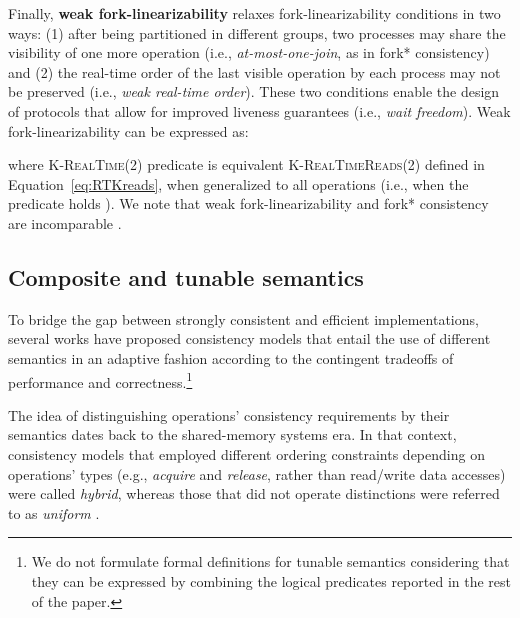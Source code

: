 \documentclass[letter, 11pt]{article}
\renewcommand{\cite}{\citep}
\begin{document}
Finally, \textbf{weak fork-linearizability} \cite{Cachin.Keidar.ea:11} relaxes fork-linearizability conditions
in two ways: (1) after being partitioned in different groups, two processes may 
share the visibility of one more operation
(i.e., \emph{at-most-one-join}, as in fork* consistency) 
and (2) the real-time order of the last visible operation by each process may not be preserved (i.e., \emph{weak real-time order}).
These two conditions enable the design of protocols that allow for improved liveness guarantees (i.e., \emph{wait freedom}).
Weak fork-linearizability can be expressed as:

where \textsc{K-RealTime}(2) predicate is equivalent \textsc{K-RealTimeReads}(2) defined in Equation~\ref{eq:RTKreads}, when generalized to all operations (i.e., when the predicate holds ).
We note that weak fork-linearizability and fork* consistency are incomparable \cite{Cachin.Keidar.ea:11}.



\subsection{Composite and tunable semantics}
\label{subsec:tunable}
To bridge the gap between strongly consistent and efficient implementations, several works have proposed consistency models that entail the use of different semantics in an adaptive fashion 
according to the contingent tradeoffs of performance and correctness.\footnote{We do not formulate formal definitions for tunable semantics considering that they can be expressed by combining the logical predicates reported in the rest of the paper.}

The idea of distinguishing operations' consistency requirements by their semantics dates back to 
the shared-memory systems era.
In that context, consistency models that employed different ordering constraints depending
on operations' types (e.g., \emph{acquire} and \emph{release}, rather than read/write data accesses) 
were called \emph{hybrid}, whereas those that did not operate distinctions were referred to as
\emph{uniform} \cite{Mosberger:93,Dubois.Scheurich.ea:86,Gharachorloo.Lenoski.ea:90}.
\end{document}
